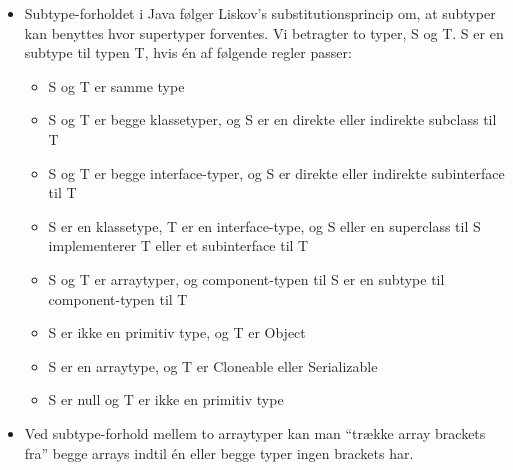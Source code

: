 \begin{itemize}
  \item Subtype-forholdet i Java følger Liskov’s substitutionsprincip om, at subtyper kan benyttes hvor supertyper forventes. Vi betragter to typer, S og T. S er en subtype til typen T, hvis én af følgende regler passer:
  \begin{itemize}
    \item S og T er samme type
    \item S og T er begge klassetyper, og S er en direkte eller indirekte subclass til T
    \item S og T er begge interface-typer, og S er direkte eller indirekte subinterface til T
    \item S er en klassetype, T er en interface-type, og S eller en superclass til S implementerer T eller et subinterface til T
    \item S og T er arraytyper, og component-typen til S er en subtype til component-typen til T
    \item S er ikke en primitiv type, og T er Object
    \item S er en arraytype, og T er Cloneable eller Serializable
    \item S er null og T er ikke en primitiv type
  \end{itemize}

  \item Ved subtype-forhold mellem to arraytyper kan man “trække array brackets fra” begge arrays indtil én eller begge typer ingen brackets har.
  

\end{itemize}
